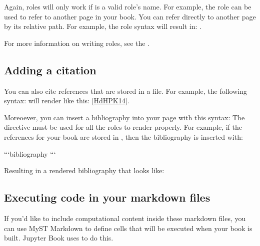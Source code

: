 \documentclass[letterpaper,10pt,english]{jupyterBook}
\begin{document}
\sphinxAtStartPar
Again, roles will only work if  is a valid role’s name. For example,
the  role can be used to refer to another page in your book. You can
refer directly to another page by its relative path. For example, the
role syntax  will result in: {\hyperref[\detokenize{intro::doc}]{}}.

\sphinxAtStartPar
For more information on writing roles, see the
.


\subsection{Adding a citation}
\label{\detokenize{markdown:adding-a-citation}}
\sphinxAtStartPar
You can also cite references that are stored in a  file. For example,
the following syntax:  will render like
this: {[}\hyperlink{cite.markdown:id3}{HdHPK14}{]}.

\sphinxAtStartPar
Moreoever, you can insert a bibliography into your page with this syntax:
The  directive must be used for all the  roles to
render properly.
For example, if the references for your book are stored in ,
then the bibliography is inserted with:

\begin{sphinxVerbatim}[commandchars=\\\{\}]
```\PYGZob{}bibliography\PYGZcb{}
```
\end{sphinxVerbatim}

\sphinxAtStartPar
Resulting in a rendered bibliography that looks like:

\sphinxAtStartPar



\subsection{Executing code in your markdown files}
\label{\detokenize{markdown:executing-code-in-your-markdown-files}}
\sphinxAtStartPar
If you’d like to include computational content inside these markdown files,
you can use MyST Markdown to define cells that will be executed when your
book is built. Jupyter Book uses  to do this.
\end{document}
